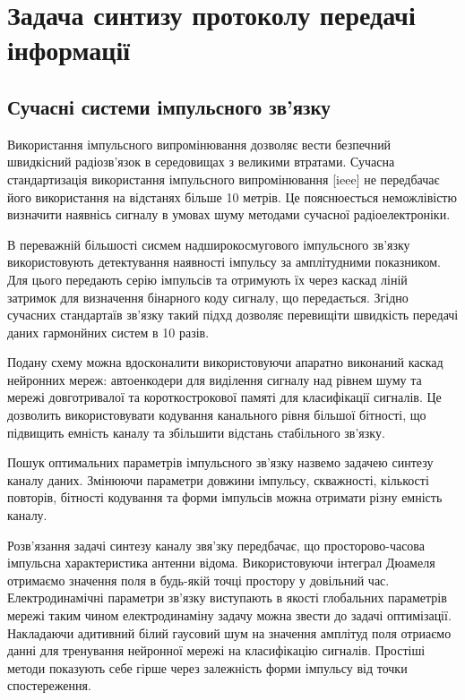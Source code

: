 \chapter{Задача синтизу протоколу передачі інформації}
\label{ch:neuron}

\section{Сучасні системи імпульсного зв'язку}

Використання імпульсного випромінювання дозволяє вести безпечний швидкісний 
радіозв'язок в середовищах з великими втратами. Сучасна стандартизація 
використання імпульсного випромінювання [ieee] не передбачає його використання 
на відстанях більше 10 метрів. Це пояснюесться неможлівістю визначити наявнісь 
сигналу в умовах шуму методами сучасної радіоелектроніки.

В переважній більшості сисмем надширокосмугового імпульсного зв'язку 
використовують детектування наявності імпульсу за амплітудними показником.
Для цього передають серію імпульсів та отримують їх через каскад ліній затримок 
для визначення бінарного коду сигналу, що передається. Згідно сучасних
стандартаїв зв'язку такий підхд дозволяє перевищіти швидкість передачі даних 
гармонйних систем в 10 разів.

Подану схему можна вдосконалити використовуючи апаратно виконаний каскад 
нейронних мереж: автоенкодери для виділення сигналу над рівнем шуму та мережі 
довготривалої та короткострокової памяті для класифікації сигналів. Це дозволить 
використовувати кодування канального рівня більшої бітності, що підвищить 
емність каналу та збільшити відстань стабільного зв'язку.

Пошук оптимальних параметрів імпульсного зв'язку назвемо задачею синтезу каналу 
даних. Змінюючи параметри довжини імпульсу, скважності, кількості повторів, 
бітності кодування та форми імпульсів можна отримати різну емність каналу.

Розв'язання задачі синтезу каналу звя'зку передбачає, що просторово-часова 
імпульсна характеристика антенни відома. Використовуючи інтеграл Дюамеля 
отримаємо значення поля в будь-якій точці простору у довільний час. 
Електродинамічні параметри зв'язку виступають в якості глобальних параметрів 
мережі таким чином електродинаміну задачу можна звести до задачі оптимізації. 
Накладаючи адитивний білий гаусовий шум на значення амплітуд поля отриаємо данні 
для тренування нейронної мережі на класифікацію сигналів. Простіші методи 
показують себе гірше через залежність форми імпульсу від точки спостереження.

